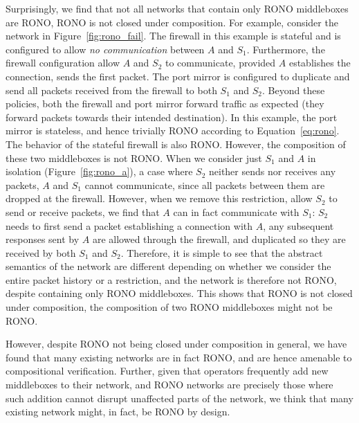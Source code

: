 Surprisingly, we find that not all networks that contain only RONO middleboxes are RONO, \ie RONO is not closed under composition. For example, consider the network in Figure~\ref{fig:rono_fail}. The firewall in this example is stateful and is configured to allow \emph{no communication} between $A$ and $S_1$. Furthermore, the firewall configuration allow $A$ and $S_2$ to communicate, provided $A$ establishes the connection, \ie sends the first packet. The port mirror is configured to duplicate and send all packets received from the firewall to both $S_1$ and $S_2$. Beyond these policies, both the firewall and port mirror forward traffic as expected (\ie they forward packets towards their intended destination). In this example, the port mirror is stateless, and hence trivially RONO according to Equation~\ref{eq:rono}. The behavior of the stateful firewall is also RONO. However, the composition of these two middleboxes is not RONO. When we consider just $S_1$ and $A$ in isolation (Figure~\ref{fig:rono_a}), \ie a case where $S_2$ neither sends nor receives any packets, $A$ and $S_1$ cannot communicate, since all packets between them are dropped at the firewall. However, when we remove this restriction, \ie allow $S_2$ to send or receive packets, we find that $A$ can in fact communicate with $S_1$: $S_2$ needs to first send a packet establishing a connection with $A$, any subsequent responses sent by $A$ are allowed through the firewall, and duplicated so they are received by both $S_1$ and $S_2$. Therefore, it is simple to see that the abstract semantics of the network are different depending on whether we consider the entire packet history or a restriction, and the network is therefore not RONO, despite containing only RONO middleboxes. This shows that RONO is not closed under composition, \ie the composition of two RONO middleboxes might not be RONO. 

However, despite RONO not being closed under composition in general, we have found that many existing networks are in fact RONO, and are hence amenable to compositional verification. Further, given that operators frequently add new middleboxes to their network, and RONO networks are precisely those where such addition cannot disrupt unaffected parts of the network, we think that many existing network might, in fact, be RONO by design.